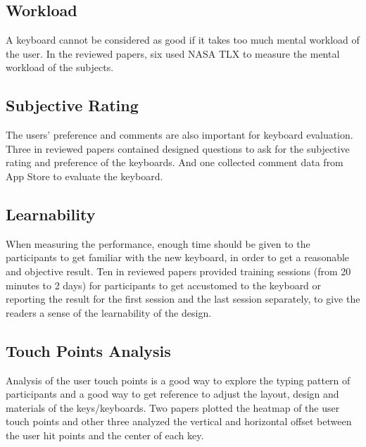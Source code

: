 \documentclass[11pt]{article}
\begin{document}
\subsection{Workload}
A keyboard cannot be considered as good if it takes too much mental workload of the user. In the reviewed papers, six used NASA TLX \citep{hart1986nasa} to measure the mental workload of the subjects.

\subsection{Subjective Rating}
The users' preference and comments are also important for keyboard evaluation. Three in reviewed papers contained designed questions to ask for the subjective rating and preference of the keyboards. And one \citep{10.1145/1520340.1520380} collected comment data from App Store to evaluate the keyboard.

\subsection{Learnability}
When measuring the performance, enough time should be given to the participants to get familiar with the new keyboard, in order to get a reasonable and objective result. Ten in reviewed papers provided training sessions (from 20 minutes to 2 days) for participants to get accustomed to the keyboard or reporting the result for the first session and the last session separately, to give the readers a sense of the learnability of the design.

\subsection{Touch Points Analysis}
Analysis of the user touch points is a good way to explore the typing pattern of participants and a good way to get reference to adjust the layout, design and materials of the keys/keyboards. Two papers plotted the heatmap of the user touch points and other three analyzed the vertical and horizontal offset between the user hit points and the center of each key. 
\end{document}
